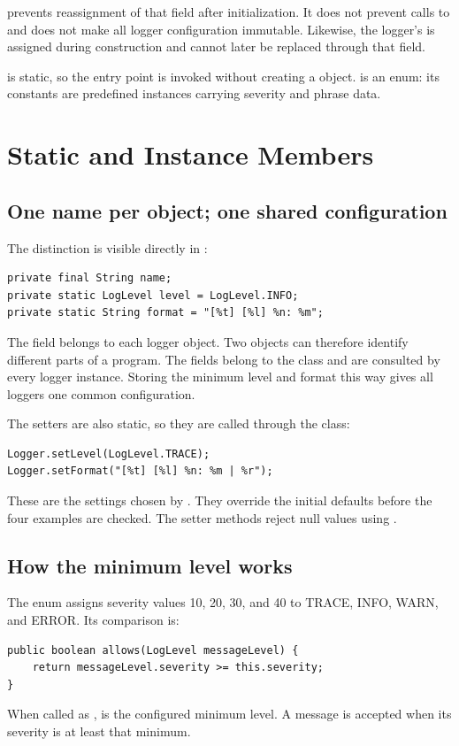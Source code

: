  prevents reassignment of that field after initialization. It does not prevent calls to  and does not make all logger configuration immutable. Likewise, the logger's  is assigned during construction and cannot later be replaced through that field.

 is static, so the entry point is invoked without creating a  object.  is an enum: its constants are predefined instances carrying severity and phrase data.

\newpage
\section{Static and Instance Members}
\subsection{One name per object; one shared configuration}
The distinction is visible directly in :
\begin{lstlisting}
private final String name;
private static LogLevel level = LogLevel.INFO;
private static String format = "[%t] [%l] %n: %m";
\end{lstlisting}
The  field belongs to each logger object. Two objects can therefore identify different parts of a program. The  fields belong to the class and are consulted by every logger instance. Storing the minimum level and format this way gives all loggers one common configuration.

The setters are also static, so they are called through the class:
\begin{lstlisting}
Logger.setLevel(LogLevel.TRACE);
Logger.setFormat("[%t] [%l] %n: %m | %r");
\end{lstlisting}
These are the settings chosen by . They override the initial defaults before the four examples are checked. The setter methods reject null values using .

\subsection{How the minimum level works}
The enum assigns severity values 10, 20, 30, and 40 to TRACE, INFO, WARN, and ERROR. Its comparison is:
\begin{lstlisting}
public boolean allows(LogLevel messageLevel) {
    return messageLevel.severity >= this.severity;
}
\end{lstlisting}
When called as ,  is the configured minimum level. A message is accepted when its severity is at least that minimum.

